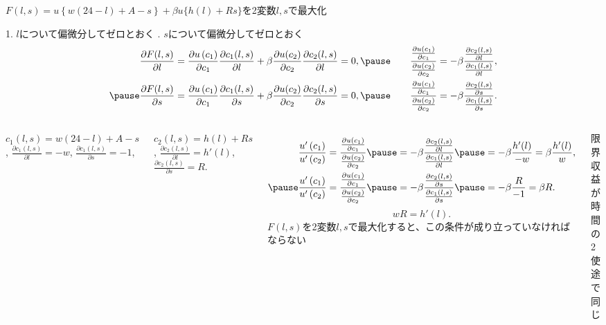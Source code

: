 \begin{frame}[t]{}
$F(l, s)=u\left\{w(24-l)+A-s\right\}+\beta u\{h(l)+Rs\}$を2変数$l, s$で最大化

\pause
{\scriptsize 1. $l$について偏微分してゼロとおく . $s$について偏微分してゼロとおく}
\[
\begin{aligned}
\frac{\partial F(l, s)}{\partial l}
&=
\frac{\partial u\left(c_{1}\right)}{\partial c_{1}}\frac{\partial c_{1}(l, s)}{\partial l}
+\beta \frac{\partial u(c_{2})}{\partial c_{2}}\frac{\partial c_{2}(l, s)}{\partial l}=0, 
\pause
\quad 
&\frac{\frac{\partial u\left(c_{1}\right)}{\partial c_{1}}}{\frac{\partial u\left(c_{2}\right)}{\partial c_{2}}}
&=
-\beta \frac{\frac{\partial c_{2}(l, s)}{\partial l}}{\frac{\partial c_{1}(l, s)}{\partial l}},\\
\pause
\frac{\partial F(l, s)}{\partial s}
&=
\frac{\partial u\left(c_{1}\right)}{\partial c_{1}}\frac{\partial c_{1}(l, s)}{\partial s}
+\beta \frac{\partial u(c_{2})}{\partial c_{2}}\frac{\partial c_{2}(l, s)}{\partial s}=0, 
\pause
\quad
&\frac{\frac{\partial u\left(c_{1}\right)}{\partial c_{1}}}{\frac{\partial u\left(c_{2}\right)}{\partial c_{2}}}
&=
-\beta \frac{\frac{\partial c_{2}(l, s)}{\partial s}}{\frac{\partial c_{1}(l, s)}{\partial s}}.
\end{aligned}
\]

\begin{columns}[T]
\pause
$c_{1}(l, s)=w(24-l)+A-s$\pause, $\frac{\partial c_{1}(l, s)}{\partial l}=-w$, $\frac{\partial c_{1}(l, s)}{\partial s}=-1$, 

\pause
$c_{2}(l, s)=h(l)+Rs$\pause, $\frac{\partial c_{2}(l, s)}{\partial l}=h'(l)$, $\frac{\partial c_{2}(l, s)}{\partial s}=R$.

\vspace{-1ex}
\pause
\[
\begin{aligned}
\frac{u'\left(c_{1}\right)}{u'\left(c_{2}\right)}&=
\frac{\frac{\partial u\left(c_{1}\right)}{\partial c_{1}}}{\frac{\partial u\left(c_{2}\right)}{\partial c_{2}}}
\pause
=
-\beta \frac{\frac{\partial c_{2}(l, s)}{\partial l}}{\frac{\partial c_{1}(l, s)}{\partial l}}
\pause
=-\beta\frac{h'(l)}{-w}=\beta\frac{h'(l)}{w},\\
\pause
\frac{u'\left(c_{1}\right)}{u'\left(c_{2}\right)}&=
\frac{\frac{\partial u\left(c_{1}\right)}{\partial c_{1}}}{\frac{\partial u\left(c_{2}\right)}{\partial c_{2}}}
\pause
=
-\beta \frac{\frac{\partial c_{2}(l, s)}{\partial s}}{\frac{\partial c_{1}(l, s)}{\partial s}}
\pause
=-\beta\frac{R}{-1}=\beta R. 
\end{aligned}
\]
\pause
\[
wR=h'(l).
\]
$F(l, s)$を2変数$l, s$で最大化すると、この条件が成り立っていなければならない

\pause
限界収益が時間の2使途で同じ
\end{columns}
\end{frame}


